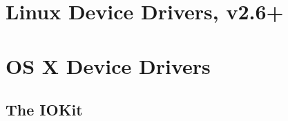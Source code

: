\documentclass[12pt]{article}
\begin{document}
\doublespacing

\tableofcontents
\pagebreak

\section{Linux Device Drivers, v2.6+}


\section{OS X Device Drivers}
\subsection{The IOKit}
\end{document}
